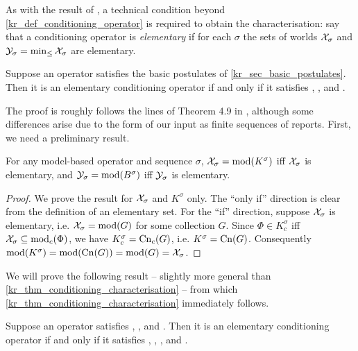 As with the result of \citeauthor{delgrande2018general}, a technical condition beyond
\cref{kr_def_conditioning_operator} is required to obtain the characterisation:
say that a conditioning operator is \emph{elementary} if for each $\sigma$ the
sets of worlds $\mathcal{X}_\sigma$ and $\mathcal{Y}_\sigma = \min_{\le}\mathcal{X}_\sigma$ are
elementary.\footnotemark{}
%

\begin{theorem}
    \label{kr_thm_conditioning_characterisation}
    Suppose an operator satisfies the basic postulates of
    \cref{kr_sec_basic_postulates}.\footnotemark{} Then it is an elementary
    conditioning operator if and only if it satisfies \duprem{},
    \condcons{}, \incvac{} and \acyc{}.

\end{theorem}

The proof is roughly follows the lines of Theorem 4.9 in
\cite{delgrande2018general}, although some
differences arise due to the form of our input as finite sequences of reports.
First, we need a preliminary result.

\begin{lemma}
\label{kr_lemma_model_based_elementary}
    For any model-based operator and sequence $\sigma$, $\mathcal{X}_\sigma =
    \operatorname{mod}(K^\sigma)$ iff $\mathcal{X}_\sigma$ is elementary, and $\mathcal{Y}_\sigma =
    \operatorname{mod}(B^\sigma)$ iff $\mathcal{Y}_\sigma$ is elementary.
\end{lemma}

\begin{proof}
We prove the result for $\mathcal{X}_\sigma$ and $K^\sigma$ only. The ``only if''
direction is clear from the definition of an elementary set. For the ``if''
direction, suppose $\mathcal{X}_\sigma$ is elementary, i.e. $\mathcal{X}_\sigma = \operatorname{mod}(G)$ for
some collection $G$. Since $\Phi \in K^\sigma_c$ iff $\mathcal{X}_\sigma \subseteq
\operatorname{mod}_c(\Phi)$, we have $K^\sigma_c = \operatorname{Cn}_c(G)$, i.e. $K^\sigma = \operatorname{Cn}(G)$.
Consequently $\operatorname{mod}(K^\sigma) = \operatorname{mod}(\operatorname{Cn}(G)) = \operatorname{mod}(G) = \mathcal{X}_\sigma$.
\end{proof}

We will prove the following result -- slightly more general than
\cref{kr_thm_conditioning_characterisation} -- from which
\cref{kr_thm_conditioning_characterisation} immediately follows.

\begin{proposition}
    \label{kr_prop_conditioning_pre_characterisation}
    Suppose an operator satisfies \closure{}, \containment{},
    \kconj{} and \equivpost{}. Then it is an elementary
    conditioning operator if and only if it satisfies \rearr{},
    \duprem{}, \condcons{},
    \incvac{} and \acyc{}.
\end{proposition}

